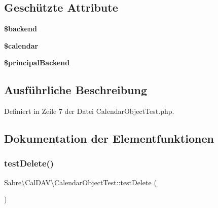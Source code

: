 \subsection*{Geschützte Attribute}
\begin{DoxyCompactItemize}
\item 
\mbox{\label{class_sabre_1_1_cal_d_a_v_1_1_calendar_object_test_afdcb3f8c2094f21c695084e4b8655a97}} 
{\bfseries \$backend}
\item 
\mbox{\label{class_sabre_1_1_cal_d_a_v_1_1_calendar_object_test_ab074cf70218d87c5a3dca4638ded6576}} 
{\bfseries \$calendar}
\item 
\mbox{\label{class_sabre_1_1_cal_d_a_v_1_1_calendar_object_test_a7cf5f83065f2f98438e506e2f43fbbdb}} 
{\bfseries \$principal\+Backend}
\end{DoxyCompactItemize}


\subsection{Ausführliche Beschreibung}


Definiert in Zeile 7 der Datei Calendar\+Object\+Test.\+php.



\subsection{Dokumentation der Elementfunktionen}
\mbox{\label{class_sabre_1_1_cal_d_a_v_1_1_calendar_object_test_a05ebe4e56f1ef0bdac555ff36c6e3069}} 
\subsubsection{\texorpdfstring{test\+Delete()}{testDelete()}}
{\footnotesize\ttfamily Sabre\textbackslash{}\+Cal\+D\+A\+V\textbackslash{}\+Calendar\+Object\+Test\+::test\+Delete (\begin{DoxyParamCaption}{ }\end{DoxyParamCaption})}

